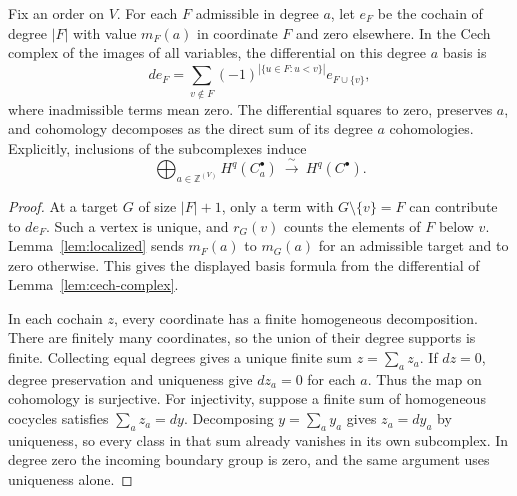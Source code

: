 \begin{lemma}\label{lem:cech-grading}
Fix an order on $V$. For each $F$ admissible in degree $a$, let $e_F$ be
the cochain of degree $|F|$ with value $m_F(a)$ in coordinate $F$ and
zero elsewhere. In the Cech complex of the images of all variables, the
differential on this degree $a$ basis is
\[
 d e_F=\sum_{v\notin F}(-1)^{|\{u\in F:u<v\}|}e_{F\cup\{v\}},
\]
where inadmissible terms mean zero. The differential squares to zero,
preserves $a$, and cohomology decomposes as the direct sum of its degree
$a$ cohomologies. Explicitly, inclusions of the subcomplexes induce
\[
 \bigoplus_{a\in\mathbb Z^{(V)}} H^q(C^\bullet_a)
       \ \xrightarrow{\ \sim\ }\ H^q(C^\bullet).
\]
\leanok
\end{lemma}
\begin{proof}
\leanok
At a target $G$ of size $|F|+1$, only a term with $G\setminus\{v\}=F$ can
contribute to $d e_F$. Such a vertex is unique, and $r_G(v)$ counts the
elements of $F$ below $v$. Lemma~\ref{lem:localized} sends $m_F(a)$ to
$m_G(a)$ for an admissible target and to zero otherwise. This gives the
displayed basis formula from the differential of Lemma~\ref{lem:cech-complex}.

In each cochain $z$, every coordinate has a finite homogeneous
decomposition. There are finitely many coordinates, so the union of their
degree supports is finite. Collecting equal degrees gives a unique finite
sum $z=\sum_a z_a$. If $dz=0$, degree preservation and uniqueness give
$dz_a=0$ for each $a$. Thus the map on cohomology is surjective.
For injectivity, suppose a finite sum of homogeneous cocycles satisfies
$\sum_a z_a=dy$. Decomposing $y=\sum_a y_a$ gives $z_a=dy_a$ by uniqueness,
so every class in that sum already vanishes in its own subcomplex. In
degree zero the incoming boundary group is zero, and the same argument
uses uniqueness alone.
\end{proof}


